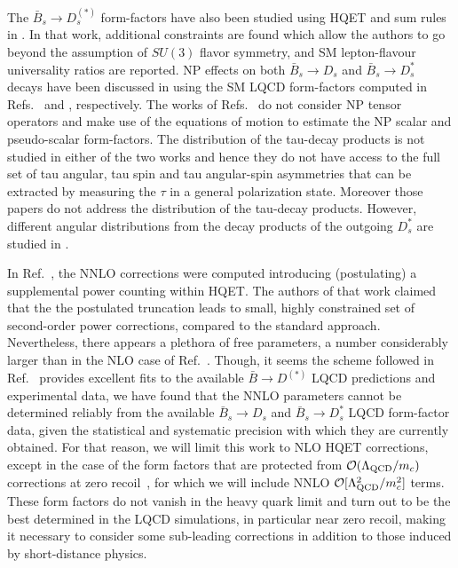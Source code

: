 \documentclass[aps,superscriptaddress,showpacs,nofootinbib,11pt]{revtex4-1}
\begin{document}
 The $\bar B_s\to D^{(*)}_s$ form-factors have also been  studied 
using HQET and sum rules in \cite{Bordone:2019guc}. In that work, additional constraints are found which allow the authors to go beyond the assumption of $SU(3)$ flavor symmetry, and SM lepton-flavour universality ratios are reported. NP effects on both $\bar B_s\to D_s$  and $\bar B_s\to D^{*}_s$ decays have been discussed in \cite{Dutta:2018jxz,Das:2021lws} using the SM LQCD form-factors computed in Refs.~\cite{Monahan:2017uby} and \cite{Harrison:2021tol}, respectively. The works of Refs.~\cite{Dutta:2018jxz,Das:2021lws} do not consider NP tensor operators and make use of the equations of motion to estimate the NP scalar and pseudo-scalar form-factors. The distribution of the tau-decay products is not studied in either of the two works and hence they do not have access to the full set of  tau angular, 
tau spin and tau angular-spin asymmetries that can be extracted  by measuring 
the $\tau$ in a general polarization state.  Moreover those papers do not address the distribution of the  tau-decay products. However, different angular distributions from the decay products of the outgoing $D_s^*$ are studied in \cite{Das:2021lws}.

In Ref.~\cite{Bernlochner:2022ywh}, the NNLO corrections were computed  introducing (postulating) a supplemental power counting within HQET. The authors of that work claimed that the the postulated truncation leads to
 small, highly constrained set of second-order power corrections, compared to the standard approach. Nevertheless, 
there appears a plethora of free parameters, a number considerably larger than in the NLO case of  Ref.~\cite{Bernlochner:2017jka}. Though, it seems the scheme followed in  Ref.~\cite{Bernlochner:2022ywh} provides excellent fits to the available $\bar B\to D^{(*)}$ LQCD predictions and experimental data, we have found that the NNLO parameters cannot be determined reliably from the available $\bar B_s\to D_s$ and $\bar B_s\to D_s^{*}$ LQCD form-factor data, given the statistical and systematic precision with which they are currently obtained. For that reason, we will limit this work to NLO HQET corrections, except in the case of the form factors that are protected from
${\cal O}(\Lambda_{\rm QCD}/m_c)$ corrections at zero recoil~\cite{Luke:1990eg}, for which we will  include NNLO
${\cal O}[\Lambda_{\rm QCD}^2/m_c^2]$ terms. These form factors do not vanish in the heavy quark limit and turn out to be the best determined in the LQCD simulations, in particular near zero recoil, making it necessary to consider some sub-leading corrections in addition to those induced by short-distance physics. 
\end{document}
